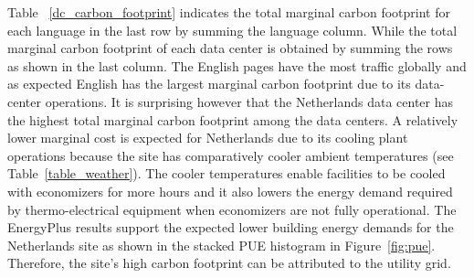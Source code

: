 
 



Table~ \ref{dc_carbon_footprint} indicates the total marginal carbon footprint for each language in the last row by summing the language column. While the total marginal carbon footprint of each data center is obtained by summing the rows as shown in the last column. The English pages have the most traffic globally and as expected English has the largest marginal carbon footprint due to its data-center operations. It is surprising however that the Netherlands data center has the highest total marginal carbon footprint among the data centers. A relatively lower marginal cost is expected for Netherlands due to its cooling plant operations because the site has comparatively cooler ambient temperatures (see Table~\ref{table_weather}). The cooler temperatures enable facilities to be cooled with economizers for more hours and it also lowers the energy demand required by thermo-electrical equipment when economizers are not fully operational. The EnergyPlus results support the expected lower building energy demands for the Netherlands site as shown in the stacked PUE histogram in Figure~\ref{fig:pue}. Therefore, the site's high carbon footprint can be attributed to the utility grid.

